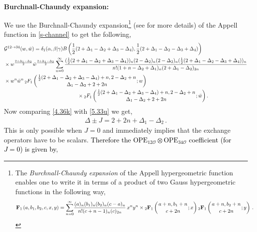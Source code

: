 \noindent
\textbf{Burchnall-Chaundy expansion:}


 We use the Burchnall-Chaundy expansion\footnote {The \textit{Burchnall-Chaundy expansion} of the Appell hypergeometric function enables one to write it in terms of a product of two Gauss hypergeometric functions in the following way,
	\begin{align}
		\label{eq:F1exp}
		\mathbf{F}_1\left(a , b_1, b_2 , c  , x, y\right) =\sum_{n=0}^\infty & {\frac{(a)_n(b_1)_n(b_2)_n(c-a)_n}  {n!(c+n-1)_n (c)_{2n}}}\,x^n y^n\times {}_{2}\mathbf{F}_1\left(\genfrac{}{}{0pt}{}{a+n,b_1+n}{c+2n};x\right) {}_{2}\mathbf{F}_1\left(\genfrac{}{}{0pt}{}{a+n,b_2+n}{c+2n};y\right)\,.
	\end{align}} \cite{Burchnall1940EXPANSIONSOA} (see \cite{Fan:2023lky} for more details) of the {Appell} function in \eqref{s-channel} to get the following,
	\begin{align}
\begin{split}
		\label{5.33u}
		&\mathcal{G}^{12\to 34}(w,\bar w)=\delta_1(\alpha,\beta|\gamma) B\left(\frac{1}{2}(2+\Delta_1-\Delta_2+\Delta_3-\Delta_4),\frac{1}{2}(2+\Delta_1-\Delta_2-\Delta_3+\Delta_4)\right) \\&\hspace{0cm} \times w^{\frac{2+\Delta_1-\Delta_2}{2}}\bar w^{\frac{2+\Delta_1-\Delta_2}{2}}\sum_{n=0}^\infty\frac{(\frac{1}{2}(2+\Delta_1-\Delta_2+\Delta_3-\Delta_4))_n(2-\Delta_2)_n(2-\Delta_2)_n(\frac{1}{2}(2+\Delta_1-\Delta_2-\Delta_3+\Delta_4))_n}{n!(1+n-\Delta_2+\Delta_1 )_n (2+\Delta_1-\Delta_2 )_{2n}}\\
		&\times w^{n}\bar{w}^{n}\,  {}_{2}{F}_1\left(\genfrac{}{}{0pt}{}{\frac{1}{2}(2+\Delta_1-\Delta_2+\Delta_3-\Delta_4)+n,2-\Delta_2+n}{\Delta_1-\Delta_2+2+2n};w\right)\\&
		\hspace{5
        cm}\times{}_{2}{F}_1\left(\genfrac{}{}{0pt}{}{\frac{1}{2}(2+\Delta_1-\Delta_2+\Delta_3-\Delta_4)+n,2-\Delta_2+n}{\Delta_1-\Delta_2+2+2n};\bar w\right).
        \end{split}
	\end{align}     
Now comparing \eqref{4.36k} with \eqref{5.33u} we get,
\begin{align}
   \Delta\pm 
 J=2+2n+\Delta_1-\Delta_2\,.
\end{align}
This is only possible when $J=0$ and immediately implies that the exchange operators have to be scalars.
\textcolor{black}{Therefore the $\textrm{OPE}_{12\mathcal{O}}\otimes \textrm{OPE}_{34\mathcal{O}}$ coefficient (for $J=0$) is given by},
